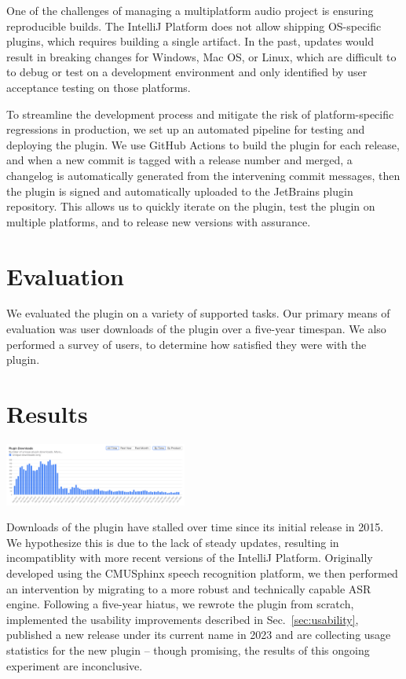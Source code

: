 \documentclass[conference]{IEEEtran}
\begin{document}
One of the challenges of managing a multiplatform audio project is ensuring reproducible builds. The IntelliJ Platform does not allow shipping OS-specific plugins, which requires building a single artifact. In the past, updates would result in breaking changes for Windows, Mac OS, or Linux, which are difficult to to debug or test on a development environment and only identified by user acceptance testing on those platforms.

To streamline the development process and mitigate the risk of platform-specific regressions in production, we set up an automated pipeline for testing and deploying the plugin. We use GitHub Actions to build the plugin for each release, and when a new commit is tagged with a release number and merged, a changelog is automatically generated from the intervening commit messages, then the plugin is signed and automatically uploaded to the JetBrains plugin repository. This allows us to quickly iterate on the plugin, test the plugin on multiple platforms, and to release new versions with assurance.

\section{Evaluation}

We evaluated the plugin on a variety of supported tasks. Our primary means of evaluation was user downloads of the plugin over a five-year timespan. We also performed a survey of users, to determine how satisfied they were with the plugin.

\section{Results}

\includegraphics[width=0.45\textwidth]{downloads.png}

Downloads of the plugin have stalled over time since its initial release in 2015. We hypothesize this is due to the lack of steady updates, resulting in incompatiblity with more recent versions of the IntelliJ Platform. Originally developed using the CMUSphinx speech recognition platform, we then performed an intervention by migrating to a more robust and technically capable ASR engine. Following a five-year hiatus, we rewrote the plugin from scratch, implemented the usability improvements described in Sec.~\ref{sec:usability}, published a new release under its current name in 2023 and are collecting usage statistics for the new plugin -- though promising, the results of this ongoing experiment are inconclusive.
\end{document}

